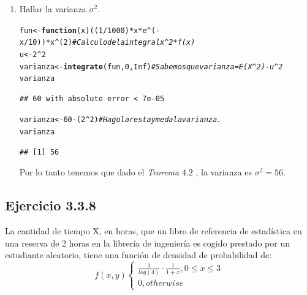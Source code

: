 \documentclass{article}\usepackage[]{graphicx}\usepackage[]{color}
\makeatletter
\newcommand{\hlnum}[1]{\textcolor[rgb]{0.686,0.059,0.569}{#1}}%
\newcommand{\hlcom}[1]{\textcolor[rgb]{0.678,0.584,0.686}{\textit{#1}}}%
\newcommand{\hlopt}[1]{\textcolor[rgb]{0,0,0}{#1}}%
\newcommand{\hlstd}[1]{\textcolor[rgb]{0.345,0.345,0.345}{#1}}%
\newcommand{\hlkwa}[1]{\textcolor[rgb]{0.161,0.373,0.58}{\textbf{#1}}}%
\newcommand{\hlkwb}[1]{\textcolor[rgb]{0.69,0.353,0.396}{#1}}%
\newcommand{\hlkwc}[1]{\textcolor[rgb]{0.333,0.667,0.333}{#1}}%
\newcommand{\hlkwd}[1]{\textcolor[rgb]{0.737,0.353,0.396}{\textbf{#1}}}%
\newenvironment{kframe}{%
 \def\at@end@of@kframe{}%
 \ifinner\ifhmode%
  \def\at@end@of@kframe{\end{minipage}}%
  \begin{minipage}{\columnwidth}%
 \fi\fi%
 \def\FrameCommand##1{\hskip\@totalleftmargin \hskip-\fboxsep
 \colorbox{shadecolor}{##1}\hskip-\fboxsep
     \hskip-\linewidth \hskip-\@totalleftmargin \hskip\columnwidth}%
 \MakeFramed {\advance\hsize-\width
   \@totalleftmargin\z@ \linewidth\hsize
   \@setminipage}}%
 {\par\unskip\endMakeFramed%
 \at@end@of@kframe}
\newenvironment{knitrout}{}{} %
\makeatother
\begin{document}
\begin{enumerate}
\item Hallar la varianza $\sigma^{2}$.
\begin{knitrout}
\color{fgcolor}\begin{kframe}
\begin{alltt}
\hlstd{fun} \hlkwb{<-} \hlkwa{function}\hlstd{(}\hlkwc{x}\hlstd{) ((}\hlnum{1}\hlopt{/}\hlnum{1000}\hlstd{)}\hlopt{*}\hlstd{x}\hlopt{*}\hlstd{e}\hlopt{^}\hlstd{(}\hlopt{-}\hlstd{x}\hlopt{/}\hlnum{10}\hlstd{))}\hlopt{*}\hlstd{x}\hlopt{^}\hlstd{(}\hlnum{2}\hlstd{)} \hlcom{#Calculo de la integral x^2*f(x)}
\hlstd{u} \hlkwb{<-} \hlnum{2}\hlopt{^}\hlnum{2}
\hlstd{varianza} \hlkwb{<-} \hlkwd{integrate}\hlstd{(fun,} \hlnum{0}\hlstd{,} \hlnum{Inf}\hlstd{)} \hlcom{#Sabemos que varianza = E(X^2) - u^2}
\hlstd{varianza}
\end{alltt}
\begin{verbatim}
## 60 with absolute error < 7e-05
\end{verbatim}
\begin{alltt}
\hlstd{varianza} \hlkwb{<-} \hlnum{60}\hlopt{-}\hlstd{(}\hlnum{2}\hlopt{^}\hlnum{2}\hlstd{)} \hlcom{#Hago la resta y me da la varianza.}
\hlstd{varianza}
\end{alltt}
\begin{verbatim}
## [1] 56
\end{verbatim}
\end{kframe}
\end{knitrout}
Por lo tanto tenemos que dado el \textit{Teorema} $4.2$ \cite[~p\'ag. 121]{Wal07}, la varianza es $\sigma^{2}=56$.
\end{enumerate}

\subsection{Ejercicio 3.3.8}

La cantidad de tiempo X, en horas, que un libro de referencia de estadística en una reserva de 2 horas en la librería de ingeniería es cogido prestado por un estudiante aleatorio, tiene una función de densidad de probabilidad de:
$$f(x,y) \begin{cases} \frac{1}{log(4)}\cdot \frac{1}{1+x}, 0 \leq x \leq 3
 \\ 0, otherwise\end{cases} $$
 
\end{document}

